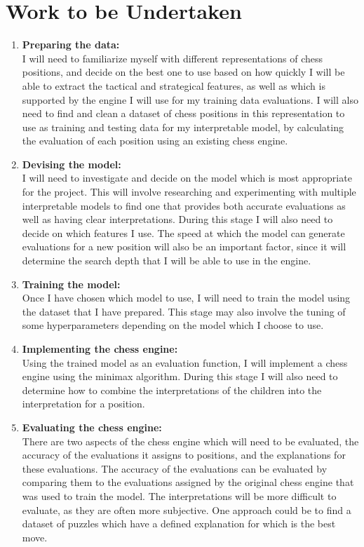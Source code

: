 \documentclass[12pt,a4paper]{article}
\begin{document}
\section*{Work to be Undertaken}
\begin{enumerate}
    \item \textbf{Preparing the data:}
    \\I will need to familiarize myself with different representations of chess positions, and decide on the best one to use based on how quickly I will be able to extract the tactical and strategical features, as well as which is supported by the engine I will use for my training data evaluations. I will also need to find and clean a dataset of chess positions in this representation to use as training and testing data for my interpretable model, by calculating the evaluation of each position using an existing chess engine.
    \item \textbf{Devising the model:}
    \\I will need to investigate and decide on the model which is most appropriate for the project. This will involve researching and experimenting with multiple interpretable models to find one that provides both accurate evaluations as well as having clear interpretations. During this stage I will also need to decide on which features I use. The speed at which the model can generate evaluations for a new position will also be an important factor, since it will determine the search depth that I will be able to use in the engine.
    \item \textbf{Training the model:}
    \\Once I have chosen which model to use, I will need to train the model using the dataset that I have prepared. This stage may also involve the tuning of some hyperparameters depending on the model which I choose to use.
    \item \textbf{Implementing the chess engine:}
    \\Using the trained model as an evaluation function, I will implement a chess engine using the minimax algorithm. During this stage I will also need to determine how to combine the interpretations of the children into the interpretation for a position.
    \item \textbf{Evaluating the chess engine:}
    \\There are two aspects of the chess engine which will need to be evaluated, the accuracy of the evaluations it assigns to positions, and the explanations for these evaluations. The accuracy of the evaluations can be evaluated by comparing them to the evaluations assigned by the original chess engine that was used to train the model. The interpretations will be more difficult to evaluate, as they are often more subjective. One approach could be to find a dataset of puzzles which have a defined explanation for which is the best move.

\end{enumerate}
\end{document}
